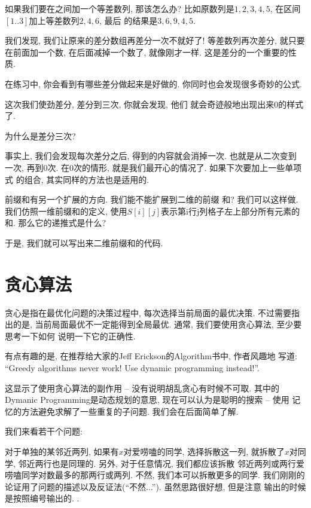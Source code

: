  如果我们要在之间加一个等差数列, 那该怎么办?
比如原数列是$1,2,3,4,5$, 在区间$[1..3]$加上等差数列$2, 4, 6$, 最后
的结果是$3, 6, 9, 4, 5$. 

我们发现, 我们让原来的差分数组再差分一次不就好了! 等差数列再次差分, 就只要
在前面加一个数, 在后面减掉一个数了, 就像刚才一样. 这是差分的一个重要的性质.

在练习中, 你会看到有哪些差分做起来是好做的. 你同时也会发现很多奇妙的公式. 

 这次我们使劲差分, 差分到三次, 你就会发现, 他们
就会奇迹般地出现出来0的样式了. 

\begin{ques}
    为什么是差分三次?
\end{ques}

事实上, 我们会发现每次差分之后, 得到的内容就会消掉一次. 也就是从二次变到
一次, 再到0次. 在0次的情形, 就是我们最开心的情况了. 如果下次要加上一些单项式
的组合, 其实同样的方法也是适用的. 

 前缀和有另一个扩展的方向. 我们能不能扩展到二维的前缀
和? 我们可以这样做. 我们仿照一维前缀和的定义, 使用$S[i][j]$表示第i行j列格子左上部分所有元素的和. 那么它的递推式是什么? 

于是, 我们就可以写出来二维前缀和的代码. 

\section{贪心算法}

贪心是指在最优化问题的决策过程中, 每次选择当前局面的最优决策. 不过需要指出的是, 
当前局面最优不一定能得到全局最优. 通常, 我们要使用贪心算法, 至少要思考一下如何
说明一下它的正确性. 

\begin{remark}
    有点有趣的是, 在推荐给大家的Jeff Erickson的Algorithm\cite{algobook}书中, 作者风趣地
    写道: ``Greedy algorithms never work! Use dynamic programming instead!''.

    这显示了使用贪心算法的副作用 -- 没有说明胡乱贪心有时候不可取. 其中的 
    Dymanic Programming是动态规划的意思, 现在可以认为是聪明的搜索 -- 使用
    记忆的方法避免求解了一些重复的子问题. 我们会在后面简单了解. 
\end{remark}

我们来看若干个问题: 

 对于单独的某邻近两列, 如果有$x$对爱唠嗑的同学, 选择拆散这一列, 
就拆散了$x$对同学, 邻近两行也是同理的. 另外, 对于任意情况, 我们都应该拆散
邻近两列或两行爱唠嗑同学对数最多的那两行或两列. 不然, 我们本可以拆散更多的同学. 
我们刚刚的论证用了问题的描述以及反证法(``不然...''). 虽然思路很好想, 但是注意
输出的时候是按照编号输出的. . 

